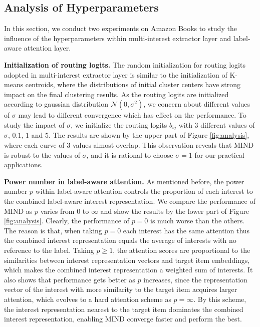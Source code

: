 \documentclass[sigconf]{acmart}
\begin{document}
\subsection{Analysis of Hyperparameters}

In this section, we conduct two experiments on Amazon Books to study the influence of the hyperparameters within multi-interest extractor layer and label-aware attention layer.

\textbf{Initialization of routing logits.}
The random initialization for routing logits adopted in multi-interest extractor layer is similar to the initialization of K-means centroids, where the distributions of initial cluster centers have strong impact on the final clustering results.
As the routing logits are initialized according to gaussian distribution $\mathcal N(0, \sigma ^ 2)$, we concern about different values of $\sigma$ may lead to different convergence which has effect on the performance.
To study the impact of $\sigma$, we initialize the routing logits $b_{ij}$ with 3 different values of $\sigma$, $0.1$, $1$ and $5$.
The results are shown by the upper part of Figure \ref{fig:analysis}, where each curve of 3 values almost overlap.
This observation reveals that MIND is robust to the values of $\sigma$, and it is rational to choose $\sigma = 1$ for our practical applications.

\textbf{Power number in label-aware attention.}
As mentioned before, the power number $p$ within label-aware attention controls the proportion of each interest to the combined label-aware interest representation.
We compare the performance of MIND as $p$ varies from $0$ to $\infty$ and show the results by the lower part of Figure \ref{fig:analysis}.
Clearly, the performance of $p = 0$ is much worse than the others.
The reason is that, when taking $p = 0$ each interest has the same attention thus the combined interest representation equals the average of interests with no reference to the label.
Taking $p \geqslant 1$, the attention scores are proportional to the similarities between interest representation vectors and target item embeddings, which makes the combined interest representation a weighted sum of interests.
It also shows that performance gets better as $p$ increases, since the representation vector of the interest with more similarity to the target item acquires larger attention, which evolves to a hard attention scheme as $p = \infty$.
By this scheme, the interest representation nearest to the target item dominates the combined interest representation, enabling MIND converge faster and perform the best.
\end{document}
